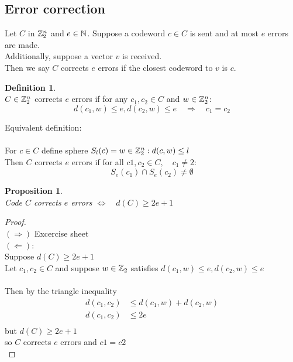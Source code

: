 \documentclass[]{article}
\newtheorem{prop}[thm]{Proposition}
\theoremstyle{definition}
\newtheorem*{defn}{Definition}
\theoremstyle{remark}
\numberwithin{equation}{section}
\begin{document}
	\subsection{Error correction}
		Let $C$ in $\mathbb{Z}_2^n$ and $e\in \mathbb N$.
		Suppose a codeword $c \in C$ is sent and at most $e$ errors are made.\\
		Additionally, suppose a vector $v$ is received.\\
		Then we say $C$ corrects $e$ errors if the closest codeword to $v$ is $c$.\\
		\begin{defn}\hfill\\
		$C \in \mathbb{Z}_2^n$ corrects $e$ errors if for any $c_1, c_2 \in C$ and $w \in \mathbb{Z}_2^n$:\\
		\[
			d(c_1,w) \leq e, d(c_2, w) \leq e\quad \Rightarrow \quad c_1 = c_2
		\]%

		Equivalent definition:\\
		\\
		For $c \in C$ define sphere $S_l(c) = {w \in \mathbb{Z}_2^n: d(c,w) \leq l}$\\
		Then $C$ corrects $e$ errors if for all $c1, c_2 \in C, \quad c_1\neq2 $:\\
		\[
			S_e(c_1) \cap S_e(c_2) \neq \emptyset
		\]

		\end{defn}
		\begin{prop}\hfill \\
		Code $C$ corrects $e$ errors $\Leftrightarrow \quad d(C) \geq 2e+1$
		\end{prop}
		\begin{proof}\hfill\\
		$(\Rightarrow)$ Excercise sheet\\
		$(\Leftarrow)$: \\
		Suppose $d(C) \geq 2e+1$\\
		Let $c_1, c_2 \in C $ and suppose $w \in \mathbb{Z}_2$ satisfies $d(c_1, w) \leq e, d(c_2,w) \leq e$\\
		\\
	 	Then by the triangle inequality\\
	 	\begin{align*}
		d(c_1,c_2) &\leq d(c_1,w) + d(c_2, w)\\
		d(c_1,c_2) &\leq 2e\\
		\end{align*}
		but $d(C) \geq 2e +1$\\
		so $C$ corrects $e$ errors and $c1 = c2$\\
		\end{proof}
\end{document}
